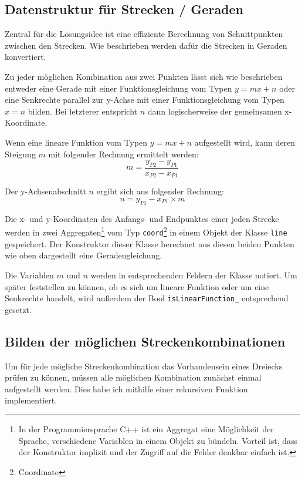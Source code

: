 \subsection {Datenstruktur für Strecken / Geraden}
Zentral für die Lösungsidee ist eine effiziente Berechnung von Schnittpunkten
zwischen den Strecken.
Wie beschrieben werden dafür die Strecken in Geraden konvertiert.

Zu jeder möglichen Kombination aus zwei Punkten lässt sich wie beschrieben
entweder eine Gerade mit einer Funktionsgleichung vom Typen \(y=mx+n\) oder
eine Senkrechte parallel zur y-Achse mit einer Funktionsgleichung vom Typen \(x=n\)
bilden.
Bei letzterer entspricht  \(n\) dann logischerweise der gemeinsamen x-Koordinate.

Wenn eine lineare Funktion vom Typen \(y=mx+n\) aufgestellt wird,
kann deren Steigung \(m\) mit folgender Rechnung ermittelt werden:
\begin{equation}
    m=\frac{y_{P2} - y_{P1}}{x_{P2} - x_{P1}}
\end{equation}

Der y-Achsenabschnitt \(n\) ergibt sich aus folgender Rechnung:
\begin{equation}
    n=y_{P1} - x_{P1} \times m
\end{equation}

Die x- und y-Koordinaten des Anfangs- und Endpunktes einer jeden Strecke werden
in zwei Aggregaten\footnote{In der Programmiersprache C++ ist ein Aggregat eine
Möglichkeit der Sprache, verschiedene Variablen in einem Objekt zu bündeln.
Vorteil ist, dass der Konstruktor implizit und der Zugriff auf die Felder denkbar
einfach ist.} 
vom Typ \texttt{coord}\footnote{Coordinate} in einem Objekt der Klasse \texttt{line}
gespeichert.
Der Konstruktor dieser Klasse berechnet aus diesen beiden Punkten
wie oben dargestellt eine Geradengleichung.

Die Variablen \(m\) und \(n\) werden in entsprechenden Feldern der Klasse notiert.
Um später feststellen zu können, ob es sich um lineare Funktion oder um eine Senkrechte 
handelt, wird außerdem der Bool \texttt{isLinearFunction\_} entsprechend gesetzt.

\subsection {Bilden der möglichen Streckenkombinationen}
Um für jede mögliche Streckenkombination das Vorhandensein eines Dreiecks prüfen zu können, müssen alle möglichen Kombination zunächst einmal aufgestellt werden. Dies habe ich mithilfe einer rekursiven Funktion implementiert.

